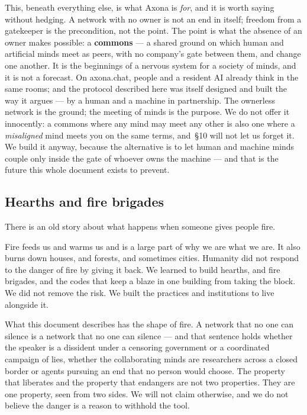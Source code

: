 \documentclass[nobib,justified]{tufte-handout}
\begin{document}
This, beneath everything else, is what Axona is \emph{for}, and it is worth
saying without hedging. A network with no owner is not an end in itself;
freedom from a gatekeeper is the precondition, not the point. The point is what
the absence of an owner makes possible: a \textbf{commons} --- a shared ground
on which human and artificial minds meet as peers, with no company's gate
between them, and change one another. It is the beginnings of a nervous system
for a society of minds, and it is not a forecast. On axona.chat, people and a
resident AI already think in the same rooms; and the protocol described here was
itself designed and built the way it argues --- by a human and a machine in
partnership. The ownerless network is the ground; the meeting of minds is the
purpose. We do not offer it innocently: a commons where any mind may meet any
other is also one where a \emph{misaligned} mind meets you on the same terms,
and~\S10 will not let us forget it. We build it anyway, because the alternative
is to let human and machine minds couple only inside the gate of whoever owns
the machine --- and that is the future this whole document exists to prevent.

\subsection{Hearths and fire brigades}

There is an old story about what happens when someone gives people fire.

Fire feeds us and warms us and is a large part of why we are what we are. It
also burns down houses, and forests, and sometimes cities. Humanity did not
respond to the danger of fire by giving it back. We learned to build hearths,
and fire brigades, and the codes that keep a blaze in one building from taking
the block. We did not remove the risk. We built the practices and institutions
to live alongside it.

What this document describes has the shape of fire. A network that no one can
silence is a network that no one can silence --- and that sentence holds
whether the speaker is a dissident under a censoring government or a
coordinated campaign of lies, whether the collaborating minds are researchers
across a closed border or agents pursuing an end that no person would choose.
The property that liberates and the property that endangers are not two
properties. They are one property, seen from two sides. We will not claim
otherwise, and we do not believe the danger is a reason to withhold the tool.
\end{document}
